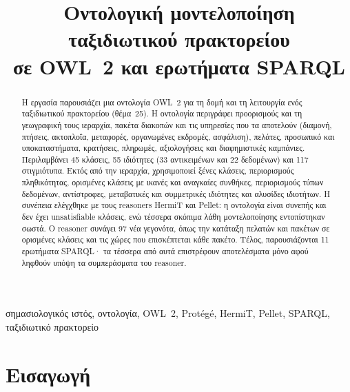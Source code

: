 \documentclass[conference]{IEEEtran}
\begin{document}
\title{Οντολογική μοντελοποίηση ταξιδιωτικού πρακτορείου\\σε OWL~2 και ερωτήματα SPARQL}

\author{
}

\maketitle

\begin{abstract}
Η εργασία παρουσιάζει μια οντολογία OWL~2 για τη δομή και τη λειτουργία ενός
ταξιδιωτικού πρακτορείου (θέμα~25). Η οντολογία περιγράφει προορισμούς και τη
γεωγραφική τους ιεραρχία, πακέτα διακοπών και τις υπηρεσίες που τα αποτελούν
(διαμονή, πτήσεις, ακτοπλοΐα, μεταφορές, οργανωμένες εκδρομές, ασφάλιση), πελάτες,
προσωπικό και υποκαταστήματα, κρατήσεις, πληρωμές, αξιολογήσεις και διαφημιστικές
καμπάνιες. Περιλαμβάνει 45 κλάσεις, 55 ιδιότητες (33 αντικειμένων και 22 δεδομένων)
και 117 στιγμιότυπα. Εκτός από την ιεραρχία, χρησιμοποιεί ξένες κλάσεις,
περιορισμούς πληθικότητας, ορισμένες κλάσεις με ικανές και αναγκαίες συνθήκες,
περιορισμούς τύπων δεδομένων, αντίστροφες, μεταβατικές και συμμετρικές ιδιότητες
και αλυσίδες ιδιοτήτων. Η συνέπεια ελέγχθηκε με τους reasoners HermiT και Pellet:
η οντολογία είναι συνεπής και δεν έχει unsatisfiable κλάσεις, ενώ τέσσερα σκόπιμα
λάθη μοντελοποίησης εντοπίστηκαν σωστά. Ο reasoner συνάγει 97 νέα γεγονότα, όπως
την κατάταξη πελατών και πακέτων σε ορισμένες κλάσεις και τις χώρες που επισκέπτεται
κάθε πακέτο. Τέλος, παρουσιάζονται 11 ερωτήματα SPARQL· τα τέσσερα από αυτά
επιστρέφουν αποτελέσματα μόνο αφού ληφθούν υπόψη τα συμπεράσματα του reasoner.
\end{abstract}

\begin{IEEEkeywords}
σημασιολογικός ιστός, οντολογία, OWL~2, Protégé, HermiT, Pellet, SPARQL, ταξιδιωτικό πρακτορείο
\end{IEEEkeywords}

\section{Εισαγωγή}
\end{document}
